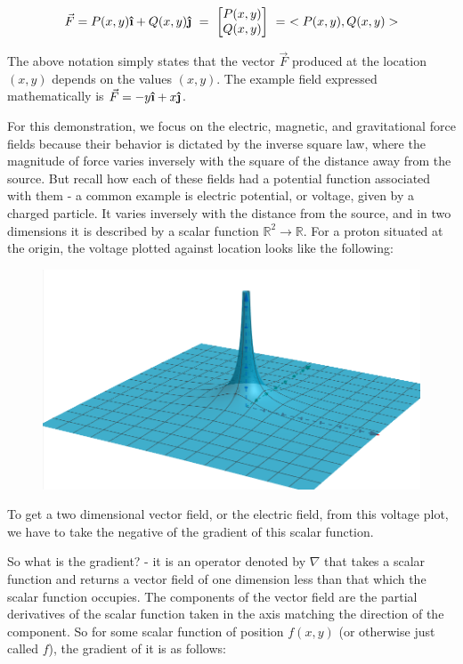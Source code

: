 \documentclass[11pt]{article}
\newcommand{\ihat}{\boldsymbol{\hat{\textbf{\i}}}}
\newcommand{\jhat}{\boldsymbol{\hat{\textbf{\j}}}}
\begin{document}
$$\vec{F} = P(x,y)\ihat + Q(x,y)\jhat ~=~ 
\begin{bmatrix}
P(x,y) \\
Q(x,y)
\end{bmatrix} ~=~ <P(x,y) , Q(x,y)>$$

The above notation simply states that the vector $\vec{F}$ produced at the location $(x,y)$ depends on the values $(x,y)$. The example field expressed mathematically is $\vec{F} = -y\ihat + x\jhat$.

For this demonstration, we focus on the electric, magnetic, and gravitational force fields because their behavior is dictated by the inverse square law, where the magnitude of force varies inversely with the square of the distance away from the source. But recall how each of these fields had a potential function associated with them - a common example is electric potential, or voltage, given by a charged particle. It varies inversely with the distance from the source, and in two dimensions it is described by a scalar function $\mathbb{R}^2 \to \mathbb{R}$. For a proton situated at the origin, the voltage plotted against location looks like the following:

\begin{figure}[h]
\centering
\includegraphics[scale=0.75]{examplevoltage}
\end{figure}

To get a two dimensional vector field, or the electric field,  from this voltage plot, we have to take the negative of the gradient of this scalar function. 

So what is the gradient? - it is an operator denoted by $\nabla$ that takes a scalar function and returns a vector field of one dimension less than that which the scalar function occupies. The components of the vector field are the partial derivatives of the scalar function taken in the axis matching the direction of the component. So for some scalar function of position $f(x,y)$ (or otherwise just called $f$), the gradient of it is as follows:
\end{document}
